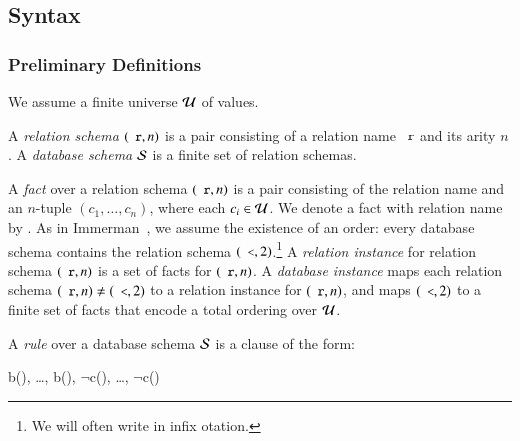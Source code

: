 \subsection{Syntax}

\subsubsection{Preliminary Definitions}


We assume a finite universe $\univ$ of values.

A {\em relation schema} $(\dedalus{r},n)$ is a pair consisting of a relation name $\dedalus{r}$ and its arity $n$.
A {\em database schema} $\schema$ is a finite set of relation schemas.

A {\em fact} over a relation schema $(\dedalus{r}, n)$ is a pair consisting of
the relation name  and an $n$-tuple $(c_1,\ldots,c_n)$, where each
$c_i \in \univ$.  We denote a fact with relation name  by
.  As in Immerman~\cite{immerman-ptime}, we assume
the existence of an order: every database schema contains the relation schema
$(\dedalus{<},2)$.\footnote{We will often write \dedalus{<} in infix otation.} 
A {\em relation instance} for relation schema $(\dedalus{r},n)$ is a set of facts for
$(\dedalus{r},n)$.  A {\em database instance} maps each relation schema $(\dedalus{r},n) \ne
(\dedalus{<},2)$ to a relation instance for $(\dedalus{r},n)$, and maps $(\dedalus{<},2)$ to a
finite set of \dedalus{<} facts that encode a total ordering over $\univ$.

A {\em rule} over a database schema $\schema$ is a clause of the form:

\begin{Drules}
        {b(), \ldots, b(), $\lnot$c(), \ldots, $\lnot$c()}
\end{Drules}

